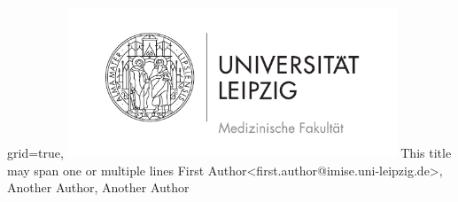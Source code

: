 \documentclass[portrait,final,a0paper,fontscale=0.320]{imiseposter}
\begin{document}
\begin{poster}%
  {grid=true,}
  {\includegraphics[height=4.5cm]{img/medfak.pdf}} 
  {This title may span one or multiple lines}
  {First Author{\small <first.author@imise.uni-leipzig.de>}, Another Author, Another Author}
  {%
  }


\end{poster}
\end{document}
